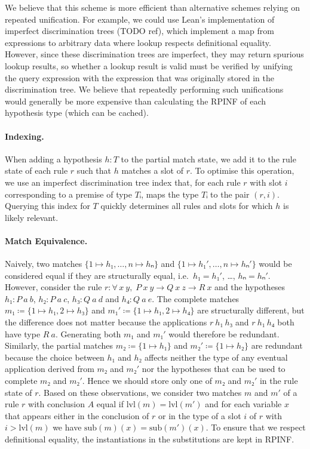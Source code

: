 \documentclass[runningheads]{llncs}
\newcommand{\All}[2]{\ensuremath{\forall\, #1,\; #2}}
\newcommand{\sub}{\ensuremath{\mathrm{sub}}}
\newcommand{\lvl}{\ensuremath{\mathrm{lvl}}}
\begin{document}
We believe that this scheme is more efficient than alternative schemes relying on repeated unification.
For example, we could use Lean's implementation of imperfect discrimination trees (TODO ref), which implement a map from expressions to arbitrary data where lookup respects definitional equality.
However, since these discrimination trees are imperfect, they may return spurious lookup results, so whether a lookup result is valid must be verified by unifying the query expression with the expression that was originally stored in the discrimination tree.
We believe that repeatedly performing such unifications would generally be more expensive than calculating the RPINF of each hypothesis type (which can be cached).

\paragraph{Indexing.}
When adding a hypothesis $h : T$ to the partial match state, we add it to the rule state of each rule $r$ such that $h$ matches a slot of $r$.
To optimise this operation, we use an imperfect discrimination tree index that, for each rule $r$ with slot $i$ corresponding to a premise of type $Tᵢ$, maps the type $Tᵢ$ to the pair $(r, i)$.
Querying this index for $T$ quickly determines all rules and slots for which $h$ is likely relevant.

\paragraph{Match Equivalence.}
Naively, two matches $\{1 ↦ h₁, \dots, n ↦ hₙ\}$ and $\{1 ↦ h₁', \dots, n ↦ hₙ'\}$ would be considered equal if they are structurally equal, i.e.\ $h₁ = h₁'$, \dots, $hₙ = hₙ'$.
However, consider the rule $r : \All{x~y}{P~x~y → Q~x~z → R~x}$ and the hypotheses $h₁ : P~a~b$, $h₂ : P~a~c$, $h₃ : Q~a~d$ and $h₄ : Q~a~e$.
The complete matches $m₁ ≔ \{1 ↦ h₁, 2 ↦ h₃\}$ and $m₁' ≔ \{1 ↦ h₁, 2 ↦ h₄\}$ are structurally different, but the difference does not matter because the applications $r~h₁~h₃$ and $r~h₁~h₄$ both have type $R~a$.
Generating both $m₁$ and $m₁'$ would therefore be redundant.
Similarly, the partial matches $m₂ ≔ \{1 ↦ h₁\}$ and $m₂' ≔ \{1 ↦ h₂\}$ are redundant because the choice between $h₁$ and $h₂$ affects neither the type of any eventual application derived from $m₂$ and $m₂'$ nor the hypotheses that can be used to complete $m₂$ and $m₂'$.
Hence we should store only one of $m₂$ and $m₂'$ in the rule state of $r$.
Based on these observations, we consider two matches $m$ and $m'$ of a rule $r$ with conclusion $A$ equal if $\lvl(m) = \lvl(m')$ and for each variable $x$ that appears either in the conclusion of $r$ or in the type of a slot $i$ of $r$ with $i > \lvl(m)$ we have $\sub(m)(x) = \sub(m')(x)$.
To ensure that we respect definitional equality, the instantiations in the substitutions are kept in RPINF.
\end{document}
